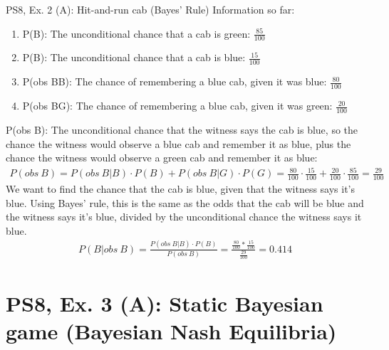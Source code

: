 \begin{frame}{PS8, Ex. 2 (A): Hit-and-run cab (Bayes' Rule)}
    Information so far:
    \begin{enumerate}
        \item P(B): The unconditional chance that a cab is green: $\frac{85}{100}$
        \item P(B): The unconditional chance that a cab is blue: $\frac{15}{100}$
        \item P(obs B\textbar B): The chance of remembering a blue cab, given it was blue: $\frac{80}{100}$
        \item P(obs B\textbar G): The chance of remembering a blue cab, given it was green: $\frac{20}{100}$
    \end{enumerate}
    P(obs B): The unconditional chance that the witness says the cab is blue, so the chance the witness would observe a blue cab and remember it as blue, plus the chance the witness would observe a green cab and remember it as blue:
    \begin{align*}
        P(obs\ B)=P(obs\ B|B)\cdot P(B)+P(obs\ B|G)\cdot P(G)=\frac{80}{100}\cdot\frac{15}{100}+\frac{20}{100}\cdot\frac{85}{100}=\frac{29}{100}
    \end{align*}
    We want to find the chance that the cab is blue, given that the witness says it's blue. Using Bayes' rule, this is the same as the odds that the cab will be blue and the witness says it's blue, divided by the unconditional chance the witness says it blue.
    \begin{align*}
        P(B|obs\ B)=\frac{P(obs\ B|B)\cdot P(B)}{P(obs\ B)}=\frac{\frac{80}{100}*\frac{15}{100}}{\frac{29}{100}}=0.414
    \end{align*}
    \vfill\null
\end{frame}



\section{PS8, Ex. 3 (A): Static Bayesian game (Bayesian Nash Equilibria)}

